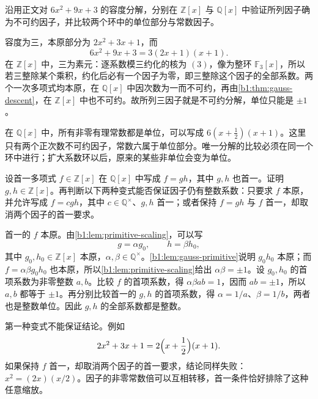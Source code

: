 \begin{exercise}\label{b1:ex:12-content-factorization}
	沿用正文对 \(6x^2+9x+3\) 的容度分解，分别在 \(\mathbb Z[x]\) 与 \(\mathbb Q[x]\) 中验证所列因子确为不可约因子，并比较两个环中的单位部分与常数因子。
\end{exercise}
\begin{solution}
	容度为三，本原部分为 \(2x^2+3x+1\)，而
	\[
		6x^2+9x+3=3(2x+1)(x+1).
	\]
	在 \(\mathbb Z[x]\) 中，三为素元：逐系数模三约化的核为 \((3)\)，像为整环 \(\mathbb F_3[x]\)，所以若三整除某个乘积，约化后必有一个因子为零，即三整除这个因子的全部系数。两个一次多项式均本原，在 \(\mathbb Q[x]\) 中因次数为一而不可约，再由\cref{b1:thm:gauss-descent}，在 \(\mathbb Z[x]\) 中也不可约。故所列三因子就是不可约分解，单位只能是 \(\pm1\)。

	在 \(\mathbb Q[x]\) 中，所有非零有理常数都是单位，可以写成 \(6(x+\tfrac12)(x+1)\)。这里只有两个正次数不可约因子，常数六属于单位部分。唯一分解的比较必须在同一个环中进行；扩大系数环以后，原来的某些非单位会变为单位。
\end{solution}

\begin{exercise}\label{b1:ex:12-monic-descent}
	设首一多项式 \(f\in\mathbb Z[x]\) 在 \(\mathbb Q[x]\) 中写成 \(f=gh\)，其中 \(g,h\) 也首一。证明 \(g,h\in\mathbb Z[x]\)。再判断以下两种变式能否保证因子仍有整数系数：只要求 \(f\) 本原，并允许写成 \(f=cgh\)，其中 \(c\in\mathbb Q^\times\)、\(g,h\) 首一；或者保持 \(f=gh\) 与 \(f\) 首一，却取消两个因子的首一要求。
\end{exercise}
\begin{solution}
	首一的 \(f\) 本原。由\cref{b1:lem:primitive-scaling}，可以写
	\[
		g=\alpha g_0,\qquad h=\beta h_0,
	\]
	其中 \(g_0,h_0\in\mathbb Z[x]\) 本原，\(\alpha,\beta\in\mathbb Q^\times\)。\cref{b1:lem:gauss-primitive}说明 \(g_0h_0\) 本原；而 \(f=\alpha\beta g_0h_0\) 也本原，所以\cref{b1:lem:primitive-scaling}给出 \(\alpha\beta=\pm1\)。设 \(g_0,h_0\) 的首项系数为非零整数 \(a,b\)。比较 \(f\) 的首项系数，得 \(\alpha\beta ab=1\)，因而 \(ab=\pm1\)，所以 \(a,b\) 都等于 \(\pm1\)。再分别比较首一的 \(g,h\) 的首项系数，得 \(\alpha=1/a\)、\(\beta=1/b\)，两者也是整数单位。因此 \(g,h\) 的全部系数都是整数。

	第一种变式不能保证结论。例如
	\[
		2x^2+3x+1=2\Bigl(x+\frac12\Bigr)(x+1).
	\]
	如果保持 \(f\) 首一，却取消两个因子的首一要求，结论同样失败：\(x^2=(2x)(x/2)\)。因子的非零常数倍可以互相转移，首一条件恰好排除了这种任意缩放。
\end{solution}

